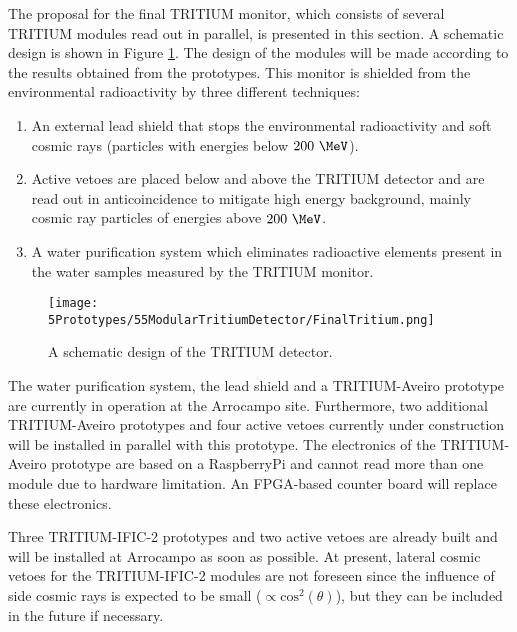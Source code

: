 The proposal for the final TRITIUM monitor, which consists of several TRITIUM modules read out in parallel, is presented in this section. A schematic design is shown in Figure \ref{fig:TritiumDetectorSchematicDesign}. The design of the modules will be made according to the results obtained from the prototypes. This monitor is shielded from the environmental radioactivity by three different techniques:

\begin{enumerate}

\item{} An external lead shield that stops the environmental radioactivity and soft cosmic rays (particles with energies below $200~\MeV$).

\item{} Active vetoes are placed below and above the TRITIUM detector and are read out in anticoincidence to mitigate high energy background, mainly cosmic ray particles of energies above $200~\MeV$.

\item{} A water purification system which eliminates radioactive elements present in the water samples measured by the TRITIUM monitor.

\end{enumerate}

\begin{figure}[h]
\centering
\texttt{[image: 5Prototypes/55ModularTritiumDetector/FinalTritium.png]}
\caption{A schematic design of the TRITIUM detector.\label{fig:TritiumDetectorSchematicDesign}}
\end{figure}

The water purification system, the lead shield and a TRITIUM-Aveiro prototype are currently in operation at the Arrocampo site. Furthermore, two additional TRITIUM-Aveiro prototypes and four active vetoes currently under construction will be installed in parallel with this prototype. The electronics of the TRITIUM-Aveiro prototype are based on a RaspberryPi and cannot read more than one module due to hardware limitation. An FPGA-based counter board will replace these electronics.

Three TRITIUM-IFIC-2 prototypes and two active vetoes are already built and will be installed at Arrocampo as soon as possible. At present, lateral cosmic vetoes for the TRITIUM-IFIC-2 modules are not foreseen since the influence of side cosmic rays is expected to be small ($\propto \text{cos}^2(\theta)$), but they can be included in the future if necessary.

